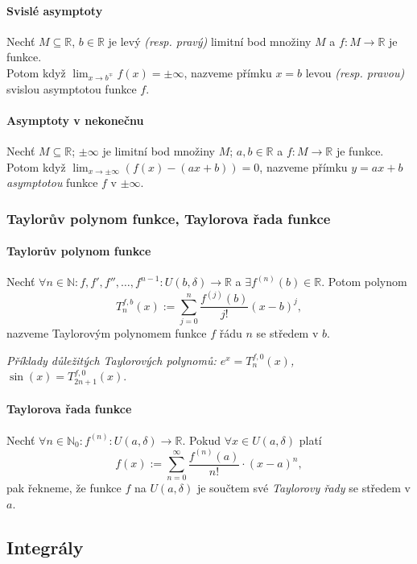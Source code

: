 \documentclass[10pt,a4paper]{article}
\newcommand{\N}{{\mathbb{N}}}
\newcommand{\R}{{\mathbb{R}}}
\begin{document}
\paragraph*{Svislé asymptoty} Nechť $M\subseteq \R$, $b\in \R$ je levý \textit{(resp. pravý)} limitní bod množiny $M$ a $f:M\to \R$ je funkce. \\
Potom když $\displaystyle \lim_{x\to b^{\mp}}f(x) = \pm \infty$, nazveme přímku $x=b$ levou \textit{(resp. pravou)} svislou asymptotou funkce $f$.
\paragraph*{Asymptoty v nekonečnu} Nechť $M\subseteq \R$; $\pm \infty$ je limitní bod množiny $M$; $a,b\in \R$ a $f:M\to \R$ je funkce. 
Potom když $\displaystyle \lim_{x\to \pm\infty} (f(x) - (ax + b)) = 0$, nazveme přímku $y = ax + b$ \textit{asymptotou} funkce $f$ v $\pm\infty$.

\subsubsection{Taylorův polynom funkce, Taylorova řada funkce}

\paragraph*{Taylorův polynom funkce} Nechť $\forall n\in \N: f, f', f{''}, \dots, f^{n-1}: U(b, \delta) \to \R$ a $\exists f^{(n)}(b)\in \R$. 
Potom polynom
\[
    T_n^{f,b}(x):= \sum_{j=0}^{n}\frac{f^{(j)}(b)}{j!}(x-b)^j,
\] nazveme Taylorovým polynomem funkce $f$ řádu $n$ se středem v $b$.

\textit{Příklady důležitých Taylorových polynomů: $e^x = T_n^{f,0}(x)$, $\sin(x) = T_{2n+1}^{f,0}(x)$}.

\paragraph*{Taylorova řada funkce} Nechť $\forall n \in \N_0: f^{(n)}: U(a, \delta) \to \R$. Pokud $\forall x \in U(a, \delta)$ platí
\[
    f(x):= \sum_{n=0}^{\infty}\frac{f^{(n)}(a)}{n!}\cdot(x-a)^n,
\] pak řekneme, že funkce $f$ na $U(a, \delta)$ je součtem své \textit{Taylorovy řady} se středem v $a$.

\subsection{Integrály}
\end{document}

